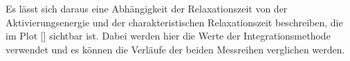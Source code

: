 Es lässt sich daraus eine Abhängigkeit der Relaxationszeit von der Aktivierungsenergie und der charakteristischen Relaxationszeit beschreiben, die im Plot [] sichtbar ist. Dabei 
werden hier die Werte der Integrationsmethode verwendet und es können die Verläufe der beiden Messreihen verglichen werden. 

